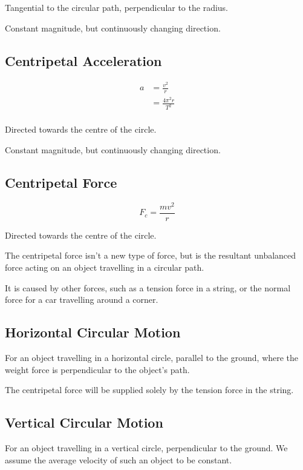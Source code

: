 \documentclass[a4paper,11pt]{report}
\begin{document}
Tangential to the circular path, perpendicular to the radius.

Constant magnitude, but continuously changing direction.

\subsection{Centripetal Acceleration}

$$
\begin{aligned}
a & = \frac{v^2}{r} \\
& = \frac{4 \pi^2 r}{T^2} \\
\end{aligned}
$$

Directed towards the centre of the circle.

Constant magnitude, but continuously changing direction.

\subsection{Centripetal Force}

$$
F_c = \frac{mv^2}{r}
$$

Directed towards the centre of the circle.

The centripetal force isn't a new type of force, but is the resultant unbalanced
force acting on an object travelling in a circular path.

It is caused by other forces, such as a tension force in a string, or the normal
force for a car travelling around a corner.

\subsection{Horizontal Circular Motion}

For an object travelling in a horizontal circle, parallel to the ground, where
the weight force is perpendicular to the object's path.

The centripetal force will be supplied solely by the tension force in the
string.

\subsection{Vertical Circular Motion}

For an object travelling in a vertical circle, perpendicular to the ground. We
assume the average velocity of such an object to be constant.
\end{document}
